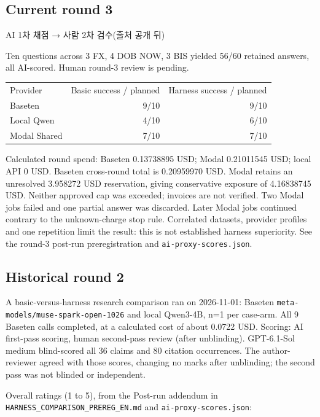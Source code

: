 \documentclass{article}
\begin{document}
\subsection{Current round 3}

AI 1차 채점 → 사람 2차 검수(출처 공개 뒤)

Ten questions across 3 FX, 4 DOB NOW, 3 BIS yielded 56/60 retained answers,
all AI-scored. Human round-3 review is pending.

\begin{center}
\begin{tabular}{lrr}
Provider & Basic success / planned & Harness success / planned \\
Baseten & 9/10 & 9/10 \\
Local Qwen & 4/10 & 6/10 \\
Modal Shared & 7/10 & 7/10 \\
\end{tabular}
\end{center}

Calculated round spend: Baseten 0.13738895 USD; Modal 0.21011545 USD;
local API 0 USD. Baseten cross-round total is 0.20959970 USD.
Modal retains an unresolved 3.958272 USD reservation, giving conservative
exposure of 4.16838745 USD. Neither approved cap was exceeded; invoices
are not verified. Two Modal jobs failed and one partial answer was discarded.
Later Modal jobs continued contrary to the unknown-charge stop rule.
Correlated datasets, provider profiles and one repetition limit the result:
this is not established harness superiority. See the round-3 post-run
preregistration and \texttt{ai-proxy-scores.json}.

\subsection{Historical round 2}

A basic-versus-harness research comparison ran on 2026-11-01: Baseten
\texttt{meta-models/muse-spark-open-1026} and local Qwen3-4B, n=1 per case-arm.
All 9 Baseten calls completed, at a calculated cost of about 0.0722 USD.
Scoring: AI first-pass scoring, human second-pass review (after unblinding).
GPT-6.1-Sol medium blind-scored all 36 claims and 80 citation occurrences.
The author-reviewer agreed with those scores, changing no marks after unblinding;
the second pass was not blinded or independent.

Overall ratings (1 to 5), from the Post-run addendum in
\texttt{HARNESS\_COMPARISON\_PREREG\_EN.md} and \texttt{ai-proxy-scores.json}:
\end{document}
